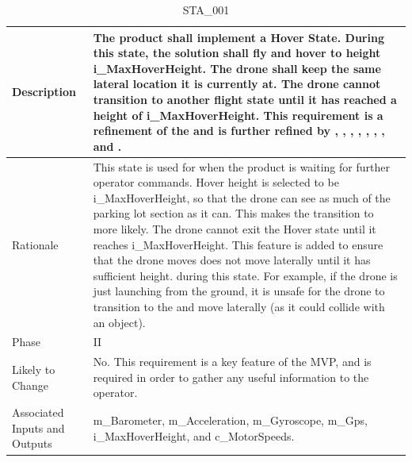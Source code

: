 \documentclass{article}
\begin{document}
\begin{table}[!h]
\begin{center}
\caption {STA\_001} 
\label{STA_001}
\begin{tabular}{ | m{3cm} | m{11cm} | }
\hline
Description & The product shall implement a Hover State. During this state, the solution shall fly and hover to height i\_MaxHoverHeight. The drone shall keep the same lateral location it is currently at. The drone cannot transition to another flight state until it has reached a height of i\_MaxHoverHeight. This requirement is a refinement of the \nameref{Hover State} and is further refined by \nameref{PERF_002}, \nameref{PERF_004}, \nameref{PERF_005}, \nameref{PERF_006}, \nameref{PERF_007}, \nameref{SAFE_001}, \nameref{SAFE_003}, and \nameref{USE_003}. \\
\hline
Rationale & This state is used for when the product is waiting for further operator commands. Hover height is selected to be i\_MaxHoverHeight, so that the drone can see as much of the parking lot section as it can. This makes the transition to \nameref{Autonomous Explore State} more likely.
The drone cannot exit the Hover state until it reaches i\_MaxHoverHeight. This feature is added to ensure that the drone moves does not move laterally until it has sufficient height. during this state. For example, if the drone is just launching from the ground, it is unsafe for the drone to transition to the \nameref{Autonomous Explore State} and move laterally (as it could collide with an object).    \\
\hline
Phase & II \\
\hline
Likely to Change & No. This requirement is a key feature of the MVP, and is required in order to gather any useful information to the operator. \\
\hline
Associated Inputs and Outputs & m\_Barometer, m\_Acceleration, m\_Gyroscope, m\_Gps, i\_MaxHoverHeight, and c\_MotorSpeeds. \\
\hline
\end{tabular}
\end{center}
\end{table}
\end{document}
